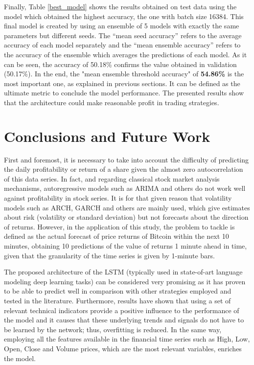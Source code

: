 \documentclass[10pt,twocolumn,letterpaper]{article}
\begin{document}

Finally, Table \ref{best_model} shows the results obtained on test data using the model which obtained the highest accuracy, the one with batch size 16384. This final model is created by using an ensemble of 5 models with exactly the same parameters but different seeds. The “mean seed accuracy” refers to the average accuracy of each model separately and the “mean ensemble accuracy” refers to the accuracy of the ensemble which averages the predictions of each model. As it can be seen, the accuracy of 50.18\% confirms the value obtained in validation (50.17\%). In the end, the "mean ensemble threshold accuracy" of \textbf{54.86\%} is the most important one, as explained in previous sections. It can be defined as the ultimate metric to conclude the model performance. The presented results show that the architecture could make reasonable profit in trading strategies.

\section{Conclusions and Future Work}

First and foremost, it is necessary to take into account the difficulty of predicting the daily profitability or return of a share given the almost zero autocorrelation of this data series. In fact, and regarding classical stock market analysis mechanisms, autoregressive models such as ARIMA and others do not work well against profitability in stock series. It is for that given reason that volatility models such as ARCH, GARCH and others are mainly used, which give estimates about risk (\ie volatility or standard deviation) but not forecasts about the direction of returns. However, in the application of this study, the problem to tackle is defined as the actual forecast of price returns of Bitcoin within the next 10 minutes, \ie obtaining 10 predictions of the value of returns 1 minute ahead in time, given that the granularity of the time series is given by 1-minute bars.

The proposed architecture of the LSTM (typically used in state-of-art language modeling deep learning tasks) can be considered very promising as it has proven to be able to predict well in comparison with other strategies employed and tested in the literature. Furthermore, results have shown that using a set of relevant technical indicators provide a positive influence to the performance of the model and it causes that these underlying trends and signals do not have to be learned by the network; thus, overfitting is reduced. In the same way, employing all the features available in the financial time series such as High, Low, Open, Close and Volume prices, which are the most relevant variables, enriches the model.
\end{document}
